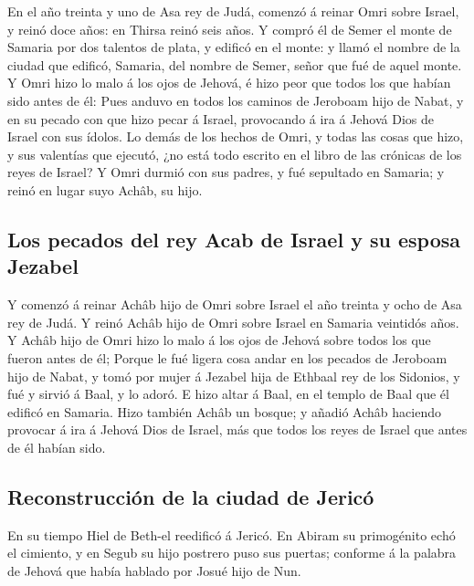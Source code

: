  En el año treinta y uno de Asa rey de Judá, comenzó á
reinar Omri sobre Israel, y reinó doce años: en Thirsa reinó seis años.
 Y compró él de Semer el monte de Samaria por dos
talentos de plata, y edificó en el monte: y llamó el nombre de la ciudad
que edificó, Samaria, del nombre de Semer, señor que fué de aquel monte.
 Y Omri hizo lo malo á los ojos de Jehová, é hizo peor
que todos los que habían sido antes de él:  Pues anduvo
en todos los caminos de Jeroboam hijo de Nabat, y en su pecado con que
hizo pecar á Israel, provocando á ira á Jehová Dios de Israel con sus
ídolos.  Lo demás de los hechos de Omri, y todas las
cosas que hizo, y sus valentías que ejecutó, ¿no está todo escrito en el
libro de las crónicas de los reyes de Israel?  Y Omri
durmió con sus padres, y fué sepultado en Samaria; y reinó en lugar suyo
Achâb, su hijo.

\hypertarget{los-pecados-del-rey-acab-de-israel-y-su-esposa-jezabel}{%
\subsection{Los pecados del rey Acab de Israel y su esposa
Jezabel}\label{los-pecados-del-rey-acab-de-israel-y-su-esposa-jezabel}}

 Y comenzó á reinar Achâb hijo de Omri sobre Israel el
año treinta y ocho de Asa rey de Judá.  Y reinó Achâb
hijo de Omri sobre Israel en Samaria veintidós años. Y Achâb hijo de
Omri hizo lo malo á los ojos de Jehová sobre todos los que fueron antes
de él;  Porque le fué ligera cosa andar en los pecados de
Jeroboam hijo de Nabat, y tomó por mujer á Jezabel hija de Ethbaal rey
de los Sidonios, y fué y sirvió á Baal, y lo adoró.  E
hizo altar á Baal, en el templo de Baal que él edificó en Samaria.
 Hizo también Achâb un bosque; y añadió Achâb haciendo
provocar á ira á Jehová Dios de Israel, más que todos los reyes de
Israel que antes de él habían sido.

\hypertarget{reconstrucciuxf3n-de-la-ciudad-de-jericuxf3}{%
\subsection{Reconstrucción de la ciudad de
Jericó}\label{reconstrucciuxf3n-de-la-ciudad-de-jericuxf3}}

 En su tiempo Hiel de Beth-el reedificó á Jericó. En
Abiram su primogénito echó el cimiento, y en Segub su hijo postrero puso
sus puertas; conforme á la palabra de Jehová que había hablado por Josué
hijo de Nun.

